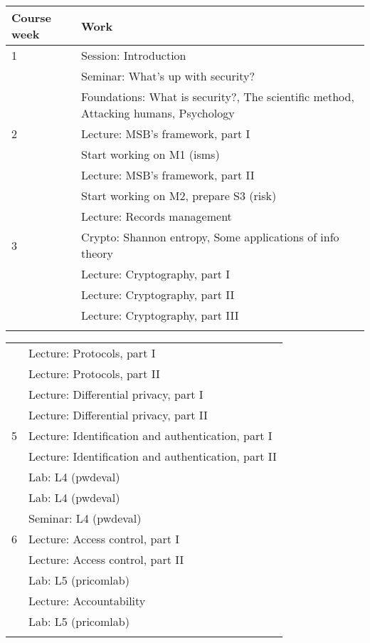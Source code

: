 	\centering
  \begin{tabular}{lp{9cm}}
    \toprule
    \textbf{Course week}	& \textbf{Work} \\
    \midrule
    1
      & Session: Introduction\\
      & Seminar: What's up with security?\\
      & Foundations: What is security?, The scientific method, Attacking 
      humans, Psychology\\
    \midrule
    2
      & Lecture: MSB's framework, part I\\
      & Start working on M1 (isms)\\
      & Lecture: MSB's framework, part II\\
      & Start working on M2, prepare S3 (risk)\\
      & Lecture: Records management\\
    \midrule
    3
      & Crypto: Shannon entropy, Some applications of info theory\\
      & Lecture: Cryptography, part I\\
      & Lecture: Cryptography, part II\\
      & Lecture: Cryptography, part III\\
    \midrule
\mode<presentation>{%
  \end{tabular}
  \begin{tabular}{lp{9cm}}
}%
    4
      & Lecture: Protocols, part I\\
      & Lecture: Protocols, part II\\
      & Lecture: Differential privacy, part I\\
      & Lecture: Differential privacy, part II\\
    \midrule
    5
      & Lecture: Identification and authentication, part I\\
      & Lecture: Identification and authentication, part II\\
      & Lab: L4 (pwdeval)\\
      & Lab: L4 (pwdeval)\\
      & Seminar: L4 (pwdeval)\\
    \midrule
    6
      & Lecture: Access control, part I\\
      & Lecture: Access control, part II\\
      & Lab: L5 (pricomlab)\\
      & Lecture: Accountability\\
      & Lab: L5 (pricomlab)\\
    \midrule
\mode<presentation>{%
  \end{tabular}
